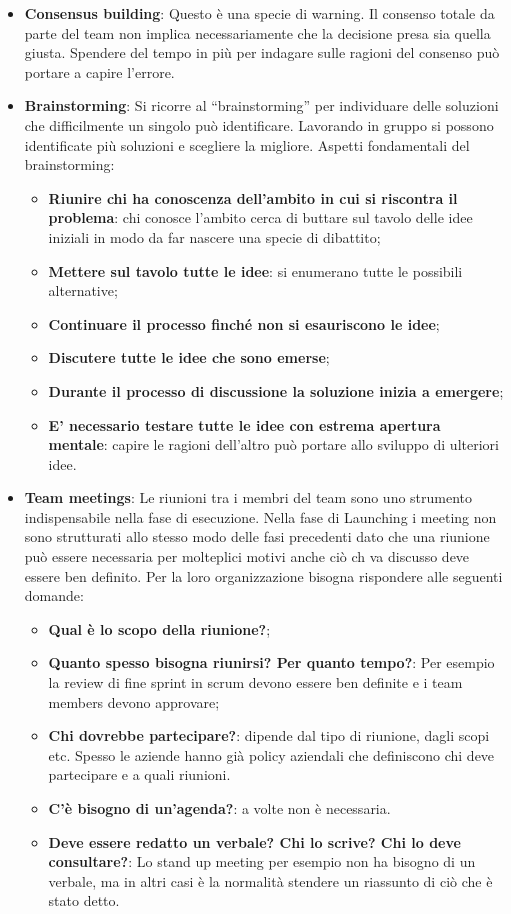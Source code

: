 \begin{itemize}
\begin{itemize}
	\end{itemize}
	\item \textbf{Consensus building}: Questo è una specie di warning. Il consenso totale da parte del team non implica necessariamente che la decisione presa sia quella giusta. Spendere del tempo in più per indagare sulle ragioni del consenso può portare a capire l'errore.
	\item \textbf{Brainstorming}: Si ricorre al “brainstorming” per individuare delle soluzioni che difficilmente un singolo può identificare. Lavorando in gruppo si possono identificate più soluzioni e scegliere la migliore. Aspetti fondamentali del brainstorming:
	\begin{itemize}
		\item \textbf{Riunire chi ha conoscenza dell’ambito in cui si riscontra il problema}: chi conosce l'ambito cerca di buttare sul tavolo delle idee iniziali in modo da far nascere una specie di dibattito;
		\item \textbf{Mettere sul tavolo tutte le idee}: si enumerano tutte le possibili alternative;
		\item \textbf{Continuare il processo finché non si esauriscono le idee};
		\item \textbf{Discutere tutte le idee che sono emerse};
		\item \textbf{Durante il processo di discussione la soluzione inizia a emergere};
		\item \textbf{E’ necessario testare tutte le idee con estrema apertura mentale}: capire le ragioni dell'altro può portare allo sviluppo di ulteriori idee.
	\end{itemize}
	\item \textbf{Team meetings}: Le riunioni tra i membri del team sono uno strumento indispensabile nella fase di esecuzione. Nella fase di Launching i meeting non sono strutturati allo stesso modo delle fasi precedenti dato che una riunione può essere necessaria per molteplici motivi anche ciò ch va discusso deve essere ben definito. Per la loro organizzazione bisogna rispondere alle seguenti domande:
	\begin{itemize}
		\item \textbf{Qual è lo scopo della riunione?};
		\item \textbf{Quanto spesso bisogna riunirsi? Per quanto tempo?}: Per esempio la review di fine sprint in scrum devono essere ben definite e i team members devono approvare;
		\item \textbf{Chi dovrebbe partecipare?}: dipende dal tipo di riunione, dagli scopi etc. Spesso le aziende hanno già policy aziendali che definiscono chi deve partecipare e a quali riunioni.
		\item \textbf{C’è bisogno di un’agenda?}: a volte non è necessaria.
		\item \textbf{Deve essere redatto un verbale? Chi lo scrive? Chi lo deve consultare?}: Lo stand up meeting per esempio non ha bisogno di un verbale, ma in altri casi è la normalità stendere un riassunto di ciò che è stato detto.
	\end{itemize}
\end{itemize}

